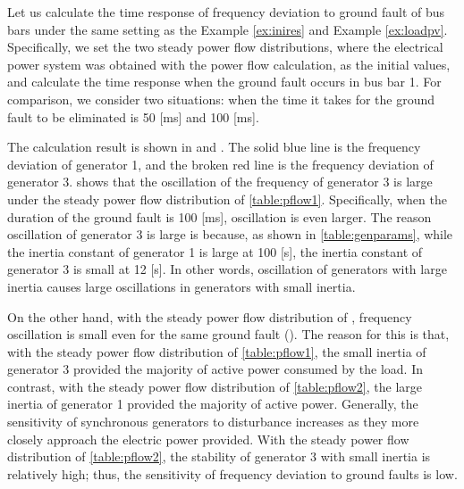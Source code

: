 \documentclass[tombow,dvipdfmx]{corona-a5-1.1}
\begin{document}
\begin{例}\label{ex:busflt}
Let us calculate the time response of frequency deviation to ground fault of bus bars under the same setting as the Example \ref{ex:inires} and Example \ref{ex:loadpv}.
Specifically, we set the two steady power flow distributions, where the electrical power system was obtained with the power flow calculation, as the initial values, and calculate the time response when the ground fault occurs in bus bar 1.
For comparison, we consider two situations: when the time it takes for the ground fault to be eliminated is 50 [ms] and 100 [ms]. 

The calculation result is shown in  and . The solid blue line is the frequency deviation of generator 1, and the broken red line is the frequency deviation of generator 3.
 shows that the oscillation of the frequency of generator 3 is large under the steady power flow distribution of \ref{table:pflow1}.
Specifically, when the duration of the ground fault is 100 [ms], oscillation is even larger. The reason oscillation of generator 3 is large is because, as shown in \ref{table:genparams}, while the inertia constant of generator 1 is large at 100 [s], the inertia constant of generator 3 is small at 12 [s].
In other words, oscillation of generators with large inertia causes large oscillations in generators with small inertia.

On the other hand, with the steady power flow distribution of , frequency oscillation is small even for the same ground fault ().
The reason for this is that, with the steady power flow distribution of \ref{table:pflow1}, the small inertia of generator 3 provided the majority of active power consumed by the load.
In contrast, with the steady power flow distribution of \ref{table:pflow2}, the large inertia of generator 1 provided the majority of active power.
Generally, the sensitivity of synchronous generators to disturbance increases as they more closely approach the electric power provided.
With the steady power flow distribution of \ref{table:pflow2}, the stability of generator 3 with small inertia is relatively high; thus, the sensitivity of frequency deviation to ground faults is low.
\end{例}
\end{document}
